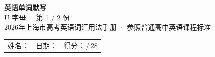 \documentclass[10pt,a4paper]{article}
\begin{document}
\pagestyle{plain}

\begin{center}
{\LARGE\bfseries 英语单词默写}\\[0.22em]
{\large U 字母 · 第 1 / 2 份}\\[0.18em]
{\small 2026年上海市高考英语词汇用法手册 · 参照普通高中英语课程标准}
\end{center}

\vspace{0.25em}
\noindent\begin{tabular}{@{}p{}@{}p{}@{}p{}@{}}
姓名：\underline{\hspace{2.0cm}} & 日期：\underline{\hspace{2.0cm}} & 得分：\underline{\hspace{1.3cm}}\,/\,28 \\
\end{tabular}

\vspace{0.3em}

\vspace{0.08em}
\end{document}
